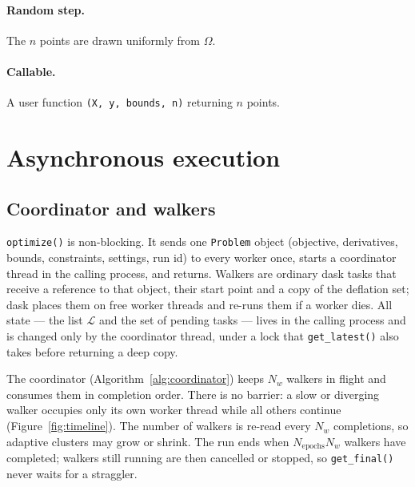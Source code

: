 \documentclass[11pt]{article}
\newcommand{\code}[1]{\texttt{#1}}
\begin{document}
\paragraph{Random step.} The $n$ points are drawn uniformly from $\Omega$.

\paragraph{Callable.} A user function \code{(X, y, bounds, n)} returning $n$ points.

\section{Asynchronous execution}\label{sec:async}

\subsection{Coordinator and walkers}

\code{optimize()} is non-blocking. It sends one \code{Problem} object (objective, derivatives,
bounds, constraints, settings, run id) to every worker once, starts a coordinator thread in the
calling process, and returns. Walkers are ordinary dask tasks that receive a reference to that
object, their start point and a copy of the deflation set; dask places them on free worker
threads and re-runs them if a worker dies. All state --- the list $\mathcal{L}$ and the set of
pending tasks --- lives in the calling process and is changed only by the coordinator thread,
under a lock that \code{get\_latest()} also takes before returning a deep copy.

The coordinator (Algorithm~\ref{alg:coordinator}) keeps $N_w$ walkers in flight and consumes
them in completion order. There is no barrier: a slow or diverging walker occupies only its
own worker thread while all others continue (Figure~\ref{fig:timeline}). The number of walkers
is re-read every $N_w$ completions, so adaptive clusters may grow or shrink. The run ends when
$N_{\text{epochs}} N_w$ walkers have completed; walkers still running are then cancelled or
stopped, so \code{get\_final()} never waits for a straggler.
\end{document}
